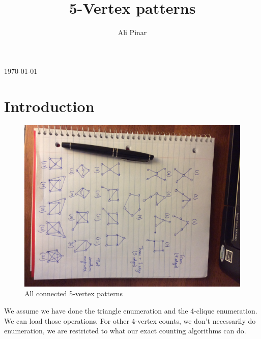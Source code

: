 \documentclass{siamltex}
\begin{document}

\title{ 5-Vertex patterns
}\author{Ali Pinar\footnotemark[2] }
\maketitle

\centerline {\sc \today}

\renewcommand{\thefootnote}{\fnsymbol{footnote}}
\renewcommand{\thefootnote}{\arabic{footnote}}
\section{Introduction} 

\begin{figure}[h]
\begin{center}
\includegraphics[angle=90,origin=c, width=1\linewidth]{5-vertex.jpg}
\caption{All connected 5-vertex patterns}
\label{fig:5patterns}
\end{center}
\end{figure}

We assume we have   done the triangle enumeration and the 4-clique enumeration.   We can load those operations.  For other 4-vertex counts, we don't necessarily do enumeration,  we are restricted to what our exact counting algorithms can do.  
\end{document}

